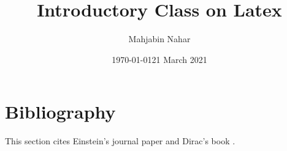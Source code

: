 \documentclass[16pt, a4paper]{article} %
\title{Introductory Class on Latex}
\author{Mahjabin Nahar}
\date{\today}
\date{21 March 2021}
\begin{document}
\maketitle
\tableofcontents %
\pagebreak %

\section{Bibliography}
This section cites Einstein's journal paper \cite{einstein} and Dirac's book \cite{dirac}. 

\printbibliography
\end{document}
